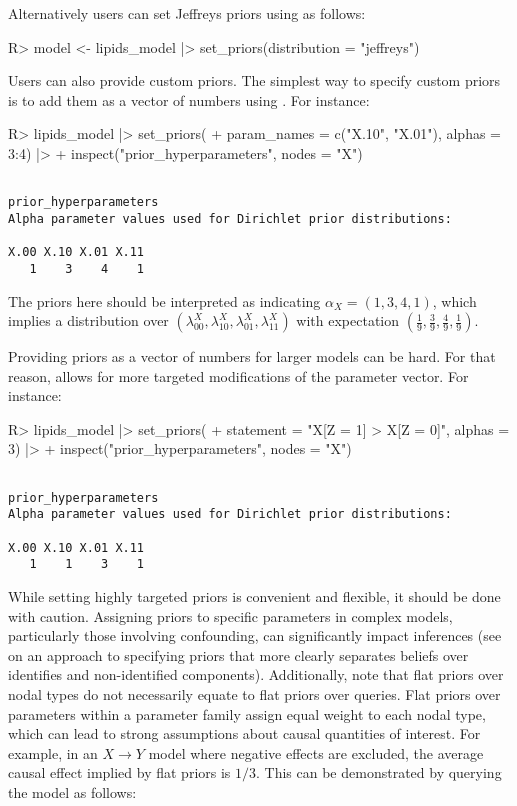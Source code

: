 \documentclass[
  11pt,
  article]{jss}
\renewcommand{\texttt}[1]{\code{#1}}
\begin{document}
Alternatively users can set Jeffreys priors using \texttt{set\_priors()}
as follows:

\begin{CodeInput}
R> model <- lipids_model |> set_priors(distribution = "jeffreys")
\end{CodeInput}

Users can also provide custom priors. The simplest way to specify custom
priors is to add them as a vector of numbers using
\texttt{set\_priors()}. For instance:

\begin{CodeInput}
R> lipids_model |> set_priors(
+    param_names = c("X.10", "X.01"), alphas = 3:4) |> 
+    inspect("prior_hyperparameters", nodes = "X")
\end{CodeInput}

\begin{verbatim}

prior_hyperparameters
Alpha parameter values used for Dirichlet prior distributions:

X.00 X.10 X.01 X.11 
   1    3    4    1 
\end{verbatim}

The priors here should be interpreted as indicating
\(\alpha_X = (1, 3, 4, 1)\), which implies a distribution over
\((\lambda^X_{00},\lambda^X_{10}, \lambda^X_{01}, \lambda^X_{11})\) with
expectation
\(\left(\frac{1}{9}, \frac{3}{9}, \frac{4}{9}, \frac{1}{9} \right)\).

Providing priors as a vector of numbers for larger models can be hard.
For that reason, \texttt{set\_priors()} allows for more targeted
modifications of the parameter vector. For instance:

\begin{CodeInput}
R> lipids_model |> set_priors(
+    statement = "X[Z = 1] > X[Z = 0]", alphas = 3) |>
+    inspect("prior_hyperparameters", nodes = "X")
\end{CodeInput}

\begin{verbatim}

prior_hyperparameters
Alpha parameter values used for Dirichlet prior distributions:

X.00 X.10 X.01 X.11 
   1    1    3    1 
\end{verbatim}

While setting highly targeted priors is convenient and flexible, it
should be done with caution. Assigning priors to specific parameters in
complex models, particularly those involving confounding, can
significantly impact inferences (see \citet{richardson2011transparent}
on an approach to specifying priors that more clearly separates beliefs
over identifies and non-identified components). Additionally, note that
flat priors over nodal types do not necessarily equate to flat priors
over queries. Flat priors over parameters within a parameter family
assign equal weight to each nodal type, which can lead to strong
assumptions about causal quantities of interest. For example, in an
\(X \rightarrow Y\) model where negative effects are excluded, the
average causal effect implied by flat priors is \(1/3\). This can be
demonstrated by querying the model as follows:
\end{document}
